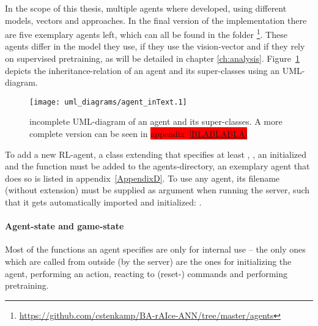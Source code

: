 In the scope of this thesis, multiple agents where developed, using different models, vectors and approaches. In the final version of the implementation there are five exemplary agents left, which can all be found in the folder \footnote{\url{https://github.com/cstenkamp/BA-rAIce-ANN/tree/master/agents}}. These agents differ in the model they use, if they use the vision-vector and if they rely on supervised pretraining, as will be detailed in chapter \ref{ch:analysis}. %
Figure~\ref{fig:agentMINI} depicts the inheritance-relation of an agent and its super-classes using an UML-diagram.
\begin{figure}[h]
	\centering 
	\texttt{[image: uml\_diagrams/agent\_inText.1]}  
	\caption[UML-diagram of an agent and its super-classes]{incomplete UML-diagram of an agent and its super-classes. A more complete version can be seen in \colorbox{red}{appendix~\ref{BLABLABLA}}}
	\label{fig:agentMINI}
\end{figure}

To add a new RL-agent, a class extending  that specifies at least , , an initialized  and the function  must be added to the agents-directory, an exemplary agent that does so is listed in appendix~\ref{AppendixD}. To use any agent, its filename (without extension) must be supplied as argument when running the server, such that it gets automatically imported and initialized: .

\paragraph{Agent-state and game-state}

Most of the functions an agent specifies are only for internal use -- the only ones which are called from outside (by the server) are the ones for initializing the agent, performing an action, reacting to (reset-) commands and performing pretraining.

